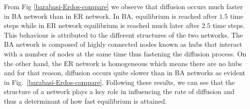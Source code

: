 \documentclass[10pt,a4paper]{article}
\theoremstyle{plain}
\theoremstyle{definition}
\begin{document}
      From Fig \ref{barabasi-Erdos-compare} we observe that diffusion occurs much faster in BA network than in ER network. In BA, equilibrium is reached after $1.5$ time steps while in ER network equilibrium is reached much later after $2.5$ time steps. This behaviour is attributed to the different structures of the two networks. The BA network is composed of highly connected nodes known as hubs that interact with a number of nodes at the same time thus fastening the diffusion process. On the other hand, the ER network is homogeneous which means there are no hubs and for that reason, diffusion occurs quite slower than in BA networks as evident in Fig.~\ref{barabasi-Erdos-compare}. Following these results, we can see that the structure of a network plays a key role in influencing the rate of diffusion and thus a determinant of how fast equilibrium is attained.
      
\end{document}
